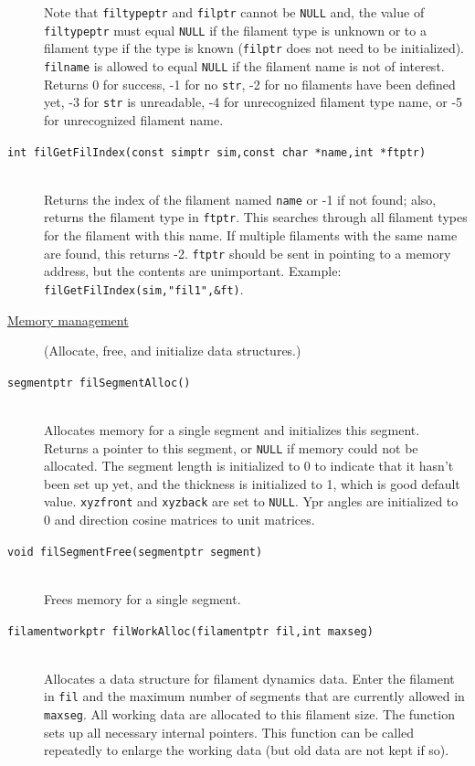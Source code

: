 \documentclass {scrbook}
\newcommand {\ttt} {\texttt}
\begin{document}
\begin{description}
Note that \ttt{filtypeptr} and \ttt{filptr} cannot be \ttt{NULL} and, the value of \ttt{filtypeptr} must equal \ttt{NULL} if the filament type is unknown or to a filament type if the type is known (\ttt{filptr} does not need to be initialized). \ttt{filname} is allowed to equal \ttt{NULL} if the filament name is not of interest. Returns 0 for success, -1 for no \ttt{str}, -2 for no filaments have been defined yet, -3 for \ttt{str} is unreadable, -4 for unrecognized filament type name, or -5 for unrecognized filament name.

\item[\ttt{int filGetFilIndex(const simptr sim,const char *name,int *ftptr)}]
\hfill \\
Returns the index of the filament named \ttt{name} or -1 if not found; also, returns the filament type in \ttt{ftptr}. This searches through all filament types for the filament with this name. If multiple filaments with the same name are found, this returns -2. \ttt{ftptr} should be sent in pointing to a memory address, but the contents are unimportant. Example: \ttt{filGetFilIndex(sim,"fil1",\&ft)}.


\item[\underline{Memory management}]
(Allocate, free, and initialize data structures.)

\item[\ttt{segmentptr filSegmentAlloc()}]
\hfill \\
Allocates memory for a single segment and initializes this segment. Returns a pointer to this segment, or \ttt{NULL} if memory could not be allocated. The segment length is initialized to 0 to indicate that it hasn't been set up yet, and the thickness is initialized to 1, which is good default value. \ttt{xyzfront} and \ttt{xyzback} are set to \ttt{NULL}. Ypr angles are initialized to 0 and direction cosine matrices to unit matrices.

\item[\ttt{void filSegmentFree(segmentptr segment)}]
\hfill \\
Frees memory for a single segment.

\item[\ttt{filamentworkptr filWorkAlloc(filamentptr fil,int maxseg)}]
\hfill \\
Allocates a data structure for filament dynamics data. Enter the filament in \ttt{fil} and the maximum number of segments that are currently allowed in \ttt{maxseg}. All working data are allocated to this filament size. The function sets up all necessary internal pointers. This function can be called repeatedly to enlarge the working data (but old data are not kept if so).


\end{description}
\end{document}
